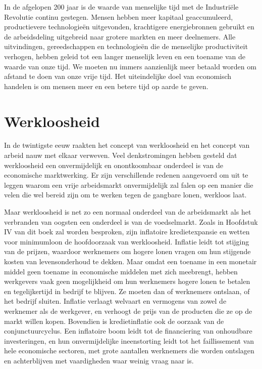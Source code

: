 In de afgelopen 200 jaar is de waarde van
menselijke tijd met de Industriële Revolutie continu gestegen. Mensen hebben meer kapitaal
geaccumuleerd, productievere technologieën uitgevonden, krachtigere
energiebronnen gebruikt en de arbeidsdeling uitgebreid naar grotere
markten en meer deelnemers. Alle uitvindingen, gereedschappen en
technologieën die de menselijke productiviteit verhogen, hebben geleid
tot een langer menselijk leven en een toename van de waarde van onze
tijd. We moeten nu immers aanzienlijk meer betaald worden om afstand te
doen van onze vrije tijd. Het uiteindelijke doel van economisch handelen is om mensen meer en een betere tijd op aarde te geven.

\section{Werkloosheid}

In de twintigste eeuw raakten het concept van werkloosheid en het
concept van arbeid nauw met elkaar verweven. Veel denkstromingen hebben
gesteld dat werkloosheid een onvermijdelijk en onontkoombaar onderdeel
is van de economische marktwerking. Er zijn verschillende redenen
aangevoerd om uit te leggen waarom een vrije arbeidsmarkt onvermijdelijk
zal falen op een manier die velen die wel bereid zijn om te werken tegen
de gangbare lonen, werkloos laat.

Maar werkloosheid is net zo een normaal onderdeel van de arbeidsmarkt
als het verbranden van oogsten een onderdeel is van de voedselmarkt.
Zoals in Hoofdstuk IV van dit boek zal worden besproken, zijn inflatoire
kredietexpansie en wetten voor minimumloon de hoofdoorzaak van
werkloosheid. Inflatie leidt tot stijging van de prijzen, waardoor
werknemers om hogere lonen vragen om hun stijgende kosten van
levensonderhoud te dekken. Maar omdat een toename in een monetair middel
geen toename in economische middelen met zich meebrengt, hebben
werkgevers vaak geen mogelijkheid om hun werknemers hogere lonen te
betalen en tegelijkertijd in bedrijf te blijven. Ze moeten dan of
werknemers ontslaan, of het bedrijf sluiten. Inflatie verlaagt welvaart
en vermogens van zowel de werknemer als de werkgever, en verhoogt de
prijs van de producten die ze op de markt willen kopen. Bovendien is
kredietinflatie ook de oorzaak van de conjunctuurcyclus. Een inflatoire
boom leidt tot de financiering van onhoudbare investeringen, en hun
onvermijdelijke ineenstorting leidt tot het faillissement van hele
economische sectoren, met grote aantallen werknemers die worden
ontslagen en achterblijven met vaardigheden waar weinig vraag naar is.

